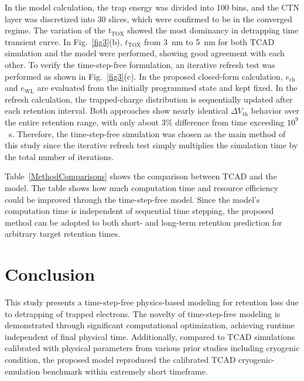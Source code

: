 \documentclass[journal,twoside,web]{ieeecolor}
\begin{document}
In the model calculation, the trap energy was divided into 100 bins, and the CTN layer was discretized into 30 slices{, which were confirmed to be in the converged regime}.
The variation of the $t_\text{TOX}$ showed the most dominancy in detrapping time transient curve.
In Fig.~\ref{fig3}(b), $t_\text{TOX}$ from 3~nm to 5~nm for both TCAD simulation and the model were performed, showing good {agreement} with each other.
{To verify the time-step-free formulation, an iterative refresh test was performed as shown in Fig.~\hbox{\ref{fig3}(c)}.}
{In the proposed closed-form calculation, $e_\mathrm{ch}$ and $e_\mathrm{WL}$ are evaluated from the initially programmed state and kept fixed.}
{In the refresh calculation, the trapped-charge distribution is sequentially updated after each retention interval.}
{Both approaches show nearly identical $\Delta V_\text{th}$ behavior over the entire retention range, with only about 3\% difference from time exceeding $10^9$~s.}
{Therefore, the time-step-free simulation was chosen as the main method of this study since the iterative refresh test simply multiplies the simulation time by the total number of iterations.}

Table~\ref{MethodComparisons} shows the comparison between TCAD and the model.
The table shows how much computation time and resource efficiency could be improved through the time-step-free model.
Since the model's computation time is independent {of} sequential time {stepping, the proposed method} can be adopted to both short- and long-term retention {prediction for arbitrary target retention times}.

\section{Conclusion}
This study presents a time-step-free physics-based modeling for retention loss due to detrapping of trapped electrons. 
The novelty of time-step-free modeling is demonstrated through significant computational optimization, achieving runtime independent of final physical time.
Additionally, compared to TCAD simulations calibrated with physical parameters from various prior studies including cryogenic condition, the proposed model {reproduced the calibrated TCAD cryogenic-emulation benchmark} within extremely short timeframe. 
\end{document}
